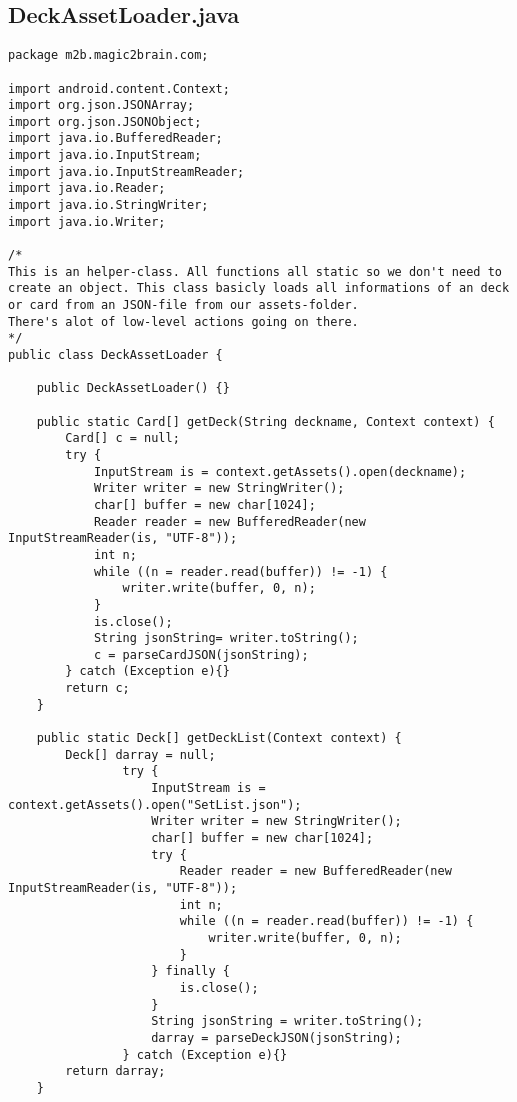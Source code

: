 \subsection{DeckAssetLoader.java}
\begin{lstlisting}
package m2b.magic2brain.com;

import android.content.Context;
import org.json.JSONArray;
import org.json.JSONObject;
import java.io.BufferedReader;
import java.io.InputStream;
import java.io.InputStreamReader;
import java.io.Reader;
import java.io.StringWriter;
import java.io.Writer;

/*
This is an helper-class. All functions all static so we don't need to create an object. This class basicly loads all informations of an deck or card from an JSON-file from our assets-folder.
There's alot of low-level actions going on there.
*/
public class DeckAssetLoader {

    public DeckAssetLoader() {}

    public static Card[] getDeck(String deckname, Context context) {
        Card[] c = null;
        try {
            InputStream is = context.getAssets().open(deckname);
            Writer writer = new StringWriter();
            char[] buffer = new char[1024];
            Reader reader = new BufferedReader(new InputStreamReader(is, "UTF-8"));
            int n;
            while ((n = reader.read(buffer)) != -1) {
                writer.write(buffer, 0, n);
            }
            is.close();
            String jsonString= writer.toString();
            c = parseCardJSON(jsonString);
        } catch (Exception e){}
        return c;
    }

    public static Deck[] getDeckList(Context context) {
        Deck[] darray = null;
                try {
                    InputStream is = context.getAssets().open("SetList.json");
                    Writer writer = new StringWriter();
                    char[] buffer = new char[1024];
                    try {
                        Reader reader = new BufferedReader(new InputStreamReader(is, "UTF-8"));
                        int n;
                        while ((n = reader.read(buffer)) != -1) {
                            writer.write(buffer, 0, n);
                        }
                    } finally {
                        is.close();
                    }
                    String jsonString = writer.toString();
                    darray = parseDeckJSON(jsonString);
                } catch (Exception e){}
        return darray;
    }


\end{lstlisting}
